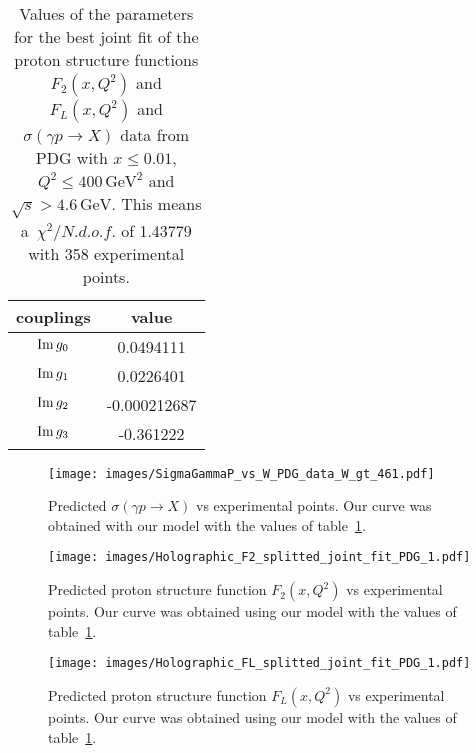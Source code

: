 \documentclass[preprint, 12pt]{elsarticle}
\begin{document}
\begin{table}[b!]
\centering
\caption{Values of the parameters for the best joint fit of the proton structure functions $F_2\left(x, Q^2\right)$ and $F_L\left(x, Q^2\right)$ and $\sigma\left(\gamma p \rightarrow X\right)$ data from PDG with $x \leq 0.01$, $Q^2 \leq 400 \, \text{GeV}^2$ and $\sqrt{s} > 4.6 \, \text{GeV}$. This means a~$\chi^2 / {N.d.o.f.}$ of 1.43779 with 358 experimental points.}
\vspace{0.5cm}
\begin{tabular}{|c|c|}
\hline
couplings   & value \\
\hline
${\rm Im} \, g_0$  & 0.0494111\\ 
\hline
${\rm Im} \, g_1$  & 0.0226401 \\ 
\hline
${\rm Im} \, g_2$  & -0.000212687  \\
\hline
${\rm Im} \, g_3$  & -0.361222\\ 
\hline
\end{tabular}
\label{table:joint_DIS_GammaP_best_joint_fit_PDG}
\end{table}
\begin{figure}[!b]
\center
\texttt{[image: images/SigmaGammaP\_vs\_W\_PDG\_data\_W\_gt\_461.pdf]} 
\caption{Predicted $\sigma \left( \gamma p \rightarrow X \right)$ vs experimental points. Our curve was obtained with our model with the values of table~\ref{table:joint_DIS_GammaP_best_joint_fit_PDG}.}
\label{fig:SigmaGammaProton_best_joint_fit}
\end{figure}
\begin{figure}[!b]
\center
\texttt{[image: images/Holographic\_F2\_splitted\_joint\_fit\_PDG\_1.pdf]} 
\caption{Predicted proton structure function $F_2\left(x,Q^2\right)$ vs experimental points. Our curve was obtained using our model with the values of table~\ref{table:joint_DIS_GammaP_best_joint_fit_PDG}.}
\label{fig:F2_best_joint_fit}
\end{figure}
\begin{figure}[!b]
\center
\texttt{[image: images/Holographic\_FL\_splitted\_joint\_fit\_PDG\_1.pdf]} 
\caption{Predicted proton structure function $F_L\left(x,Q^2\right)$ vs experimental points. Our curve was obtained using our model with the values of table~\ref{table:joint_DIS_GammaP_best_joint_fit_PDG}.}
\label{fig:FL_best_joint_fit}
\end{figure}
\end{document}
